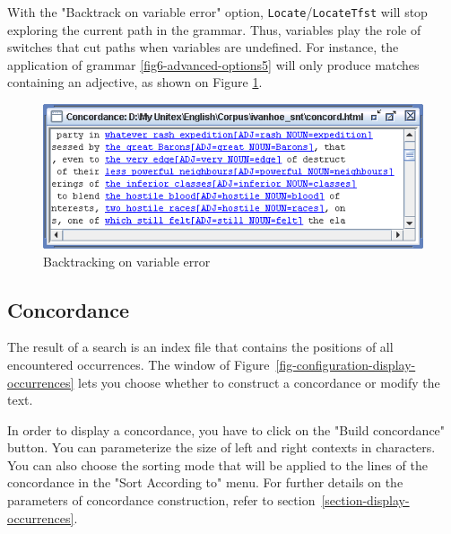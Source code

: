 \noindent With the "Backtrack on variable error" option,
\verb+Locate+/\verb+LocateTfst+ will stop exploring the current path in the
grammar. Thus, variables play the role of switches that cut paths
when variables are undefined. For instance, the application of grammar
\ref{fig6-advanced-options5} will only produce matches containing an adjective, as shown on Figure 
\ref{fig6-advanced-options8}. 

\bigskip
\begin{figure}[!h]
\begin{center}
\includegraphics[width=13cm]{resources/img/fig6-advanced-options8.png}
\caption{Backtracking on variable error\label{fig6-advanced-options8}}
\end{center}
\end{figure}



\subsection{Concordance}
The result of a search is an index file that contains the positions of all
encountered occurrences.
The window of Figure~\ref{fig-configuration-display-occurrences} lets you
choose whether to construct a concordance or modify the text.

\bigskip
{}
\noindent In order to display a concordance, you have to click on the "Build
concordance" button. You can parameterize the size of left and right contexts in characters.
You can also choose the sorting mode that will be applied to the lines of the
concordance in the "Sort According to" menu. For further details on the
parameters of concordance construction, refer to
section~\ref{section-display-occurrences}.


